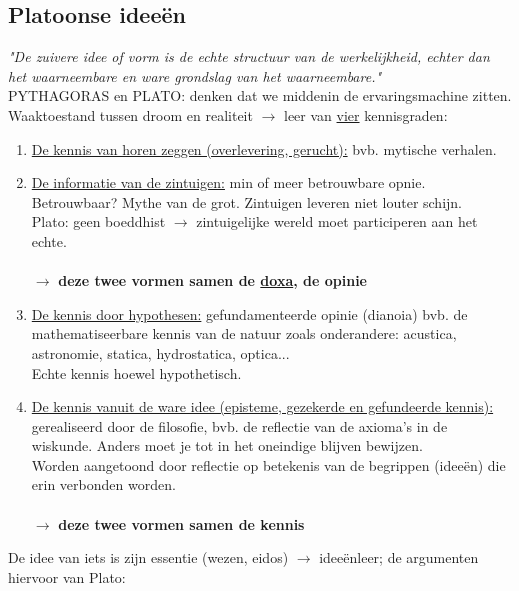 \subsection{Platoonse idee\"en}
\textit{"De zuivere idee of vorm is de echte structuur van de werkelijkheid, echter dan het waarneembare en ware grondslag van het waarneembare."}
\\
PYTHAGORAS en PLATO: denken dat we middenin de ervaringsmachine zitten.
\\
Waaktoestand tussen droom en realiteit $\rightarrow$ leer van \underline{vier} kennisgraden:
\begin{enumerate}
\item \underline{De kennis van horen zeggen (overlevering, gerucht):} bvb. mytische verhalen.
\item \underline{De informatie van de zintuigen:} min of meer betrouwbare opnie. Betrouwbaar? Mythe van de grot.
Zintuigen leveren niet louter schijn. 
\\ Plato: geen boeddhist $\rightarrow$ zintuigelijke wereld moet participeren aan het echte.
\\
\\
$\longrightarrow$ \textbf{deze twee vormen samen de \underline{doxa}, de opinie}
\item \underline{De kennis door hypothesen:} gefundamenteerde opinie (dianoia) bvb. de mathematiseerbare kennis van de natuur zoals onderandere: acustica, astronomie, statica, hydrostatica, optica...
\\
Echte kennis hoewel hypothetisch.

\item \underline{De kennis vanuit de ware idee (episteme, gezekerde en gefundeerde kennis):}
gerealiseerd door de filosofie, bvb. de reflectie van de axioma's in de wiskunde. Anders moet je tot in het oneindige blijven bewijzen.
\\
Worden aangetoond door reflectie op betekenis van de begrippen (idee\"en) die erin verbonden worden.
\\
\\
$\longrightarrow$ \textbf{deze twee vormen samen de kennis}
\end{enumerate}
De idee van iets is zijn essentie (wezen, eidos) $\rightarrow$ idee\"enleer; de argumenten hiervoor van Plato:
